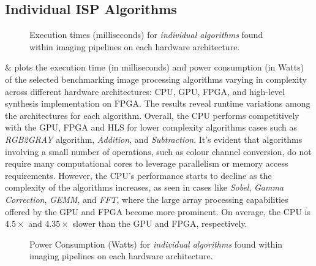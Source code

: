 \subsection{Individual ISP Algorithms}


\begin{figure}[t]
    \centering
\resizebox{\columnwidth}{!}{}    
    \caption[Individual Algorithm Runtime]{{Execution times (milliseconds) for \textit{individual algorithms} found within imaging pipelines on each hardware architecture.}}
    \label{fig:OtherAlgorithmsExecutionTime}
\end{figure}

 \&  plots the execution time (in milliseconds) and power consumption (in Watts) of the selected benchmarking image processing algorithms varying in complexity across different hardware architectures: CPU, GPU, FPGA, and high-level synthesis implementation on FPGA. The results reveal runtime variations among the architectures for each algorithm. Overall, the CPU performs competitively with the GPU, FPGA and HLS for lower complexity algorithms cases such as \textit{RGB2GRAY} algorithm, \textit{Addition}, and \textit{Subtraction}. It's evident that algorithms involving a small number of operations, such as colour channel conversion, do not require many computational cores to leverage parallelism or memory access requirements. However, the CPU's performance starts to decline as the complexity of the algorithms increases, as seen in cases like \textit{Sobel}, \textit{Gamma Correction}, \textit{GEMM}, and \textit{FFT}, where the large array processing capabilities offered by the GPU and FPGA become more prominent. On average, the CPU is $4.5\times$ and $4.35\times$ slower than the GPU and FPGA, respectively. 


\begin{figure}[t]
    \centering
\resizebox{\columnwidth}{!}{}    
    \caption[Individual Power Consumption ]{{Power Consumption (Watts) for \textit{individual algorithms} found within imaging pipelines on each hardware architecture.}}
    \label{fig:CHAP1OtherAlgorithmsPower}
\end{figure}



